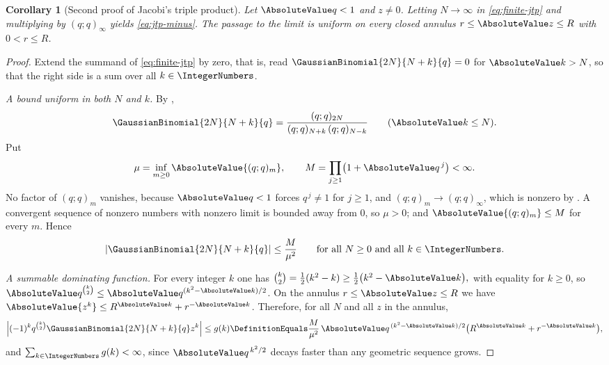 \documentclass[11pt,a4paper,oneside,openany]{book}
\newtheorem{corollary}[corollary]{Corollary}
\theoremstyle{definition}
\theoremstyle{remark}
\begin{document}
\begin{corollary}[Second proof of Jacobi's triple product]\label{cor:jtp-from-finite}
Let $\AbsoluteValue q<1$ and $z\ne0$.  Letting $N\to\infty$ in \eqref{eq:finite-jtp} and multiplying by $(q;q)_\infty$ yields \eqref{eq:jtp-minus}.  The passage to the limit is uniform on every closed annulus $r\le\AbsoluteValue z\le R$ with $0<r\le R$.
\end{corollary}

\begin{proof}
Extend the summand of \eqref{eq:finite-jtp} by zero, that is, read $\GaussianBinomial{2N}{N+k}{q}=0$ for $\AbsoluteValue k>N$, so that the right side is a sum over all $k\in\IntegerNumbers$.

\emph{A bound uniform in both $N$ and $k$.}  By ,
\[
 \GaussianBinomial{2N}{N+k}{q}
 =\frac{(q;q)_{2N}}{(q;q)_{N+k}\,(q;q)_{N-k}}
 \qquad(\AbsoluteValue k\le N).
\]
Put
\[
 \mu=\inf_{m\ge0}\AbsoluteValue{(q;q)_m},
 \qquad
 M=\prod_{j\ge1}\bigl(1+\AbsoluteValue q^{\,j}\bigr)<\infty .
\]
No factor of $(q;q)_m$ vanishes, because $\AbsoluteValue q<1$ forces $q^{\,j}\ne1$ for $j\ge1$, and $(q;q)_m\to(q;q)_\infty$, which is nonzero by .  A convergent sequence of nonzero numbers with nonzero limit is bounded away from $0$, so $\mu>0$; and $\AbsoluteValue{(q;q)_m}\le M$ for every $m$.  Hence
\begin{equation}
 \left|\GaussianBinomial{2N}{N+k}{q}\right|\le\frac{M}{\mu^{2}}
 \qquad\text{for all }N\ge0\text{ and all }k\in\IntegerNumbers .
 \label{eq:central-qbinom-uniform-bound}
\end{equation}

\emph{A summable dominating function.}  For every integer $k$ one has
\(
 \binom k2=\tfrac12(k^2-k)\ge\tfrac12\bigl(k^2-\AbsoluteValue k\bigr),
\)
with equality for $k\ge0$, so $\AbsoluteValue q^{\binom k2}\le\AbsoluteValue q^{(k^2-\AbsoluteValue k)/2}$.  On the annulus $r\le\AbsoluteValue z\le R$ we have $\AbsoluteValue{z^{k}}\le R^{\AbsoluteValue k}+r^{-\AbsoluteValue k}$.  Therefore, for all $N$ and all $z$ in the annulus,
\[
 \left|(-1)^kq^{\binom k2}\GaussianBinomial{2N}{N+k}{q}z^{k}\right|
 \le g(k)\DefinitionEquals
 \frac{M}{\mu^{2}}\,\AbsoluteValue q^{\,(k^2-\AbsoluteValue k)/2}
 \bigl(R^{\AbsoluteValue k}+r^{-\AbsoluteValue k}\bigr),
\]
and $\sum_{k\in\IntegerNumbers}g(k)<\infty$, since $\AbsoluteValue q^{\,k^2/2}$ decays faster than any geometric sequence grows.


\end{proof}
\end{document}
